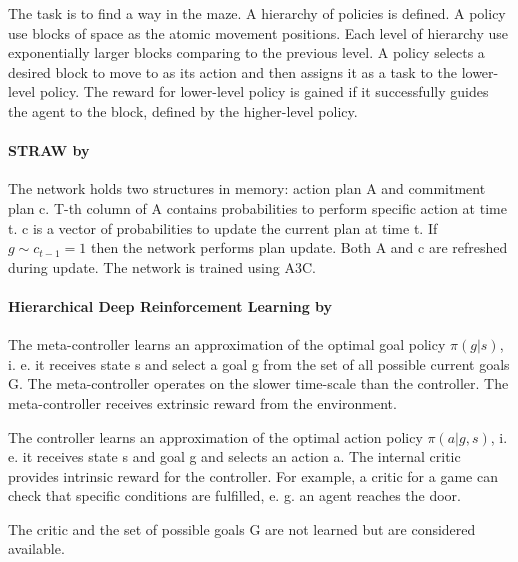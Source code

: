 \documentclass[acmsmall, nonacm]{acmart}
\begin{document}
The task is to find a way in the maze. A hierarchy of policies is defined. A policy use blocks of space as the atomic movement positions. Each level of hierarchy use exponentially larger blocks comparing to the previous level. A policy selects a desired block to move to as its action and then assigns it as a task to the lower-level policy. The reward for lower-level policy is gained if it successfully guides the agent to the block, defined by the higher-level policy.


\paragraph{STRAW by~\citet{Vezhnevets2016StrategicAW}} %
\label{par:straw}

The network holds two structures in memory: action plan A and commitment plan c. T-th column of A contains probabilities to perform specific action at time t. c is a vector of probabilities to update the current plan at time t. If $g \sim c_{t-1} = 1$ then the network performs plan update. Both A and c are refreshed during update. The network is trained using A3C.


\paragraph{Hierarchical Deep Reinforcement Learning by~\citet{Kulkarni2016HierarchicalDR}} %
\label{par:hierarchical_deep_rl}

The meta-controller learns an approximation of the optimal goal policy $\pi(g|s)$, i. e. it receives state s and select a goal g from the set of all possible current goals G. The meta-controller operates on the slower time-scale than the controller. The meta-controller receives extrinsic reward from the environment.

The controller learns an approximation of the optimal action policy $\pi(a|g,s)$, i. e. it receives state s and goal g and selects an action a. The internal critic provides intrinsic reward for the controller. For example, a critic for a game can check that specific conditions are fulfilled, e. g. an agent reaches the door.

The critic and the set of possible goals G are not learned but are considered available.

\end{document}

